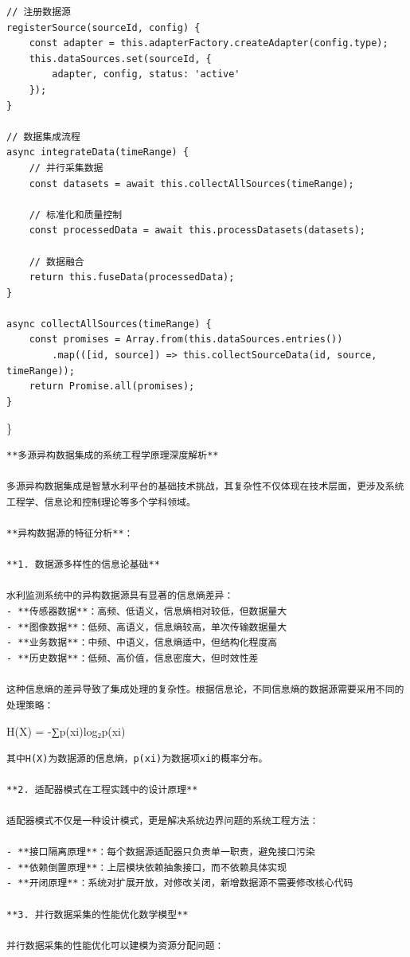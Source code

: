 \begin{verbatim}
// 注册数据源
registerSource(sourceId, config) {
    const adapter = this.adapterFactory.createAdapter(config.type);
    this.dataSources.set(sourceId, {
        adapter, config, status: 'active'
    });
}

// 数据集成流程
async integrateData(timeRange) {
    // 并行采集数据
    const datasets = await this.collectAllSources(timeRange);
    
    // 标准化和质量控制
    const processedData = await this.processDatasets(datasets);
    
    // 数据融合
    return this.fuseData(processedData);
}

async collectAllSources(timeRange) {
    const promises = Array.from(this.dataSources.entries())
        .map(([id, source]) => this.collectSourceData(id, source, timeRange));
    return Promise.all(promises);
}
\end{verbatim}

\}

\begin{lstlisting}
**多源异构数据集成的系统工程学原理深度解析**

多源异构数据集成是智慧水利平台的基础技术挑战，其复杂性不仅体现在技术层面，更涉及系统工程学、信息论和控制理论等多个学科领域。

**异构数据源的特征分析**：

**1. 数据源多样性的信息论基础**

水利监测系统中的异构数据源具有显著的信息熵差异：
- **传感器数据**：高频、低语义，信息熵相对较低，但数据量大
- **图像数据**：低频、高语义，信息熵较高，单次传输数据量大
- **业务数据**：中频、中语义，信息熵适中，但结构化程度高
- **历史数据**：低频、高价值，信息密度大，但时效性差

这种信息熵的差异导致了集成处理的复杂性。根据信息论，不同信息熵的数据源需要采用不同的处理策略：
\end{lstlisting}

H(X) = -∑p(xi)log₂p(xi)

\begin{lstlisting}
其中H(X)为数据源的信息熵，p(xi)为数据项xi的概率分布。

**2. 适配器模式在工程实践中的设计原理**

适配器模式不仅是一种设计模式，更是解决系统边界问题的系统工程方法：

- **接口隔离原理**：每个数据源适配器只负责单一职责，避免接口污染
- **依赖倒置原理**：上层模块依赖抽象接口，而不依赖具体实现
- **开闭原理**：系统对扩展开放，对修改关闭，新增数据源不需要修改核心代码

**3. 并行数据采集的性能优化数学模型**

并行数据采集的性能优化可以建模为资源分配问题：
\end{lstlisting}

